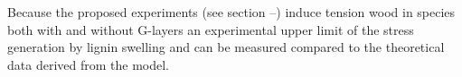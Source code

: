 Because the proposed experiments (see section --) induce tension wood in species
both with and without G-layers an experimental upper limit of the stress
generation by lignin swelling  and can be measured
compared to the theoretical data derived from the model.